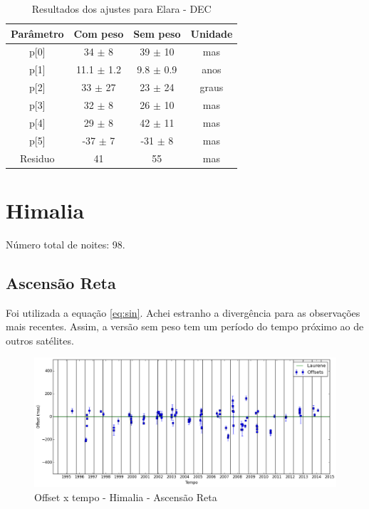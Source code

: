 \documentclass[11pt,a4paper]{report}
\begin{document}
\begin{table}[h!]
\caption{\label{Tab: Elara-DEC} Resultados dos ajustes para Elara - DEC}
\begin{centering}
\begin{tabular}{cccc}
\hline
\hline
Parâmetro & Com peso & Sem peso & Unidade\tabularnewline
\hline
p[0] & 34 $\pm$ 8 & 39 $\pm$ 10 & mas\\
p[1] & 11.1 $\pm$ 1.2 & 9.8 $\pm$ 0.9 & anos\\
p[2] & 33 $\pm$ 27 & 23 $\pm$ 24 & graus\\
p[3] & 32 $\pm$ 8 & 26 $\pm$ 10 & mas\\
p[4] & 29 $\pm$ 8 & 42 $\pm$ 11 & mas\\
p[5] & -37 $\pm$ 7 & -31 $\pm$ 8 & mas\\
Residuo & 41 & 55 & mas\\
\hline 
\end{tabular} 
\par\end{centering}
\end{table}

\chapter*{Himalia}

\indent \indent Número total de noites: 98.

\section*{Ascensão Reta}

Foi utilizada a equação \ref{eq:sin}. Achei estranho a divergência para as observações mais recentes. Assim, a versão sem peso tem um período do tempo próximo ao de outros satélites.

\begin{figure}[h]
\caption{Offset x tempo - Himalia - Ascensão Reta}
\includegraphics[scale=0.45]{Himalia/RA.png} 
\end{figure}
\end{document}
